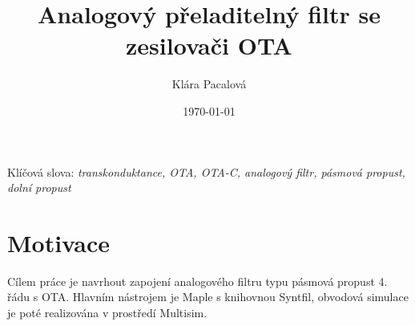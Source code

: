 \documentclass[twoside]{article}
\title{Analogový přeladitelný filtr se zesilovači OTA}
\author{Klára Pacalová}
\date{\today}
\begin{document}
\def\MapleOutput#1{{\begin{center}\begin{math}\color{MapleBlue}{#1}\end{math}\end{center}}}

\maketitle

Klíčová slova: \textit{transkonduktance, OTA, OTA-C, analogový filtr, pásmová propust, dolní propust}
\section{Motivace}
\noindent Cílem práce je navrhout zapojení analogového filtru typu pásmová propust 4. řádu s OTA. Hlavním nástrojem je Maple s knihovnou Syntfil, obvodová simulace je poté realizována v prostředí Multisim.
\end{document}
